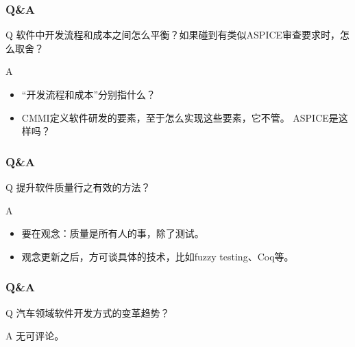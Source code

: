 \documentclass[UTF8,lualatex]{ctexbeamer}
\begin{document}
\begin{frame}
    \frametitle{Q\&A}
    \begin{alertblock}{Q}
        软件中开发流程和成本之间怎么平衡？如果碰到有类似ASPICE审查要求时，怎么取舍？
    \end{alertblock}
    \begin{block}{A}
        \begin{itemize}
            \item “开发流程和成本”分别指什么？
            \item CMMI定义软件研发的要素，至于怎么实现这些要素，它不管。
                ASPICE是这样吗？
        \end{itemize}
    \end{block}
\end{frame}

\begin{frame}
    \frametitle{Q\&A}
    \begin{alertblock}{Q}
        提升软件质量行之有效的方法？
    \end{alertblock}
    \begin{block}{A}
        \begin{itemize}
            \item 要在观念：质量是所有人的事，除了测试。
            \item 观念更新之后，方可谈具体的技术，比如fuzzy testing、Coq等。
        \end{itemize}
    \end{block}
\end{frame}

\begin{frame}
    \frametitle{Q\&A}
    \begin{alertblock}{Q}
        汽车领域软件开发方式的变革趋势？
    \end{alertblock}
    \begin{block}{A}
        无可评论。
    \end{block}
\end{frame}
\end{document}
